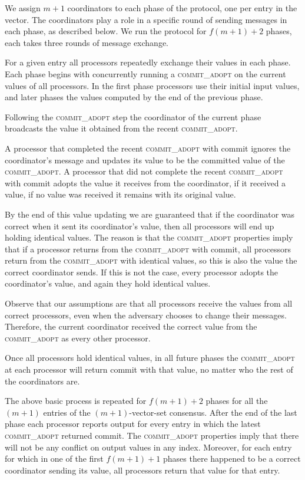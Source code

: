 \documentclass[11pt]{article}
\newcommand{\ca}{{\small\textsc{commit\!\_adopt}}\xspace}
\begin{document}
We assign $m+1$ coordinators to each phase of the protocol, one per entry in the vector.  The coordinators play a role in a specific round of sending messages in each phase, as described below.  We run the protocol for $f(m+1)+2$ phases, each takes three rounds of message exchange. 

For a given entry all processors repeatedly exchange their values in each phase.  Each phase begins with concurrently running a \ca on the current values of all processors.  In the first phase processors use their initial input values, and later phases the values  computed by the end of the previous phase. 

Following the \ca step the coordinator of the current phase broadcasts the value it obtained from the recent \ca.  

A processor that completed the recent \ca with {\sc commit} ignores the coordinator's message and updates its value to be the committed value of the \ca.
A processor that did not complete the recent \ca with {\sc commit} adopts the value it receives from the coordinator, if it received a value, if no value was received it remains with its original value.

By the end of this value updating we are guaranteed that if the coordinator was correct when it sent its coordinator's value, then all processors will end up holding identical values.  
The reason is 
that the \ca properties imply that if a processor returns from the \ca with {\sc commit}, all processors  return from the \ca with identical values, so this is also the value the correct coordinator sends.  
If this is not the case, every processor adopts the coordinator's value, and again they hold identical values.

Observe that our assumptions are that all processors receive the values from all correct processors, even when the adversary chooses to change their messages. Therefore, the current coordinator received the correct value from the \ca as every other processor.

Once all processors hold identical values, in all future phases the \ca at each processor will return {\sc commit} with that value, no matter who the rest of the coordinators are.

The above basic process is repeated for $f(m+1)+2$ phases for all the $(m+1)$ entries of the $(m+1)$-vector-set consensus.
After the end of the last phase each processor reports output for every entry in which the latest \ca returned  {\sc commit}. 
The \ca properties imply that there will not be any conflict on output values in any index. 
Moreover, for each entry for which in one of the first $f(m+1)+1$ phases there happened to be a correct coordinator sending its value,  all processors return that value for that entry.
\end{document}
